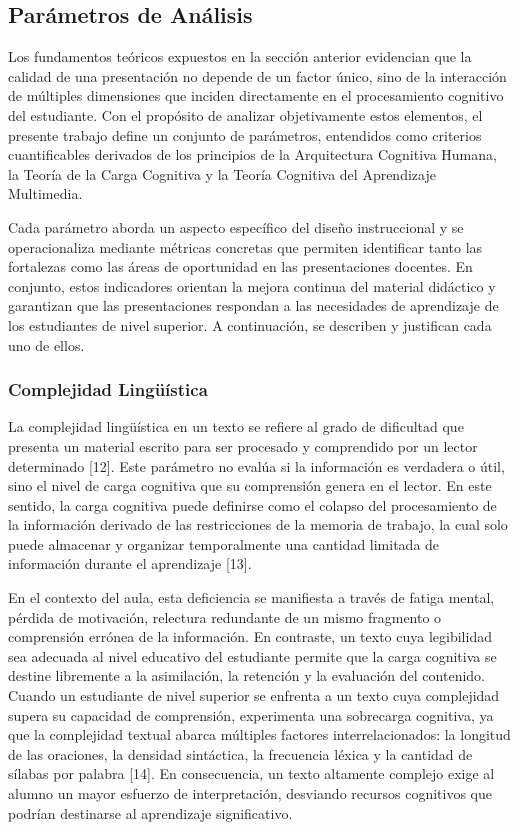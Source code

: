 \documentclass[11pt]{article}
\begin{document}
\subsection*{Parámetros de Análisis}
Los fundamentos teóricos expuestos en la sección anterior evidencian que la calidad de una presentación no depende de un factor único, sino de la interacción de múltiples dimensiones que inciden directamente en el procesamiento cognitivo del estudiante. Con el propósito de analizar objetivamente estos elementos, el presente trabajo define un conjunto de parámetros, entendidos como criterios cuantificables derivados de los principios de la Arquitectura Cognitiva Humana, la Teoría de la Carga Cognitiva y la Teoría Cognitiva del Aprendizaje Multimedia.

Cada parámetro aborda un aspecto específico del diseño instruccional y se operacionaliza mediante métricas concretas que permiten identificar tanto las fortalezas como las áreas de oportunidad en las presentaciones docentes. En conjunto, estos indicadores orientan la mejora continua del material didáctico y garantizan que las presentaciones respondan a las necesidades de aprendizaje de los estudiantes de nivel superior. A continuación, se describen y justifican cada uno de ellos.

\subsubsection*{Complejidad Lingüística}
La complejidad lingüística en un texto se refiere al grado de dificultad que presenta un material escrito para ser procesado y comprendido por un lector determinado [12]. Este parámetro no evalúa si la información es verdadera o útil, sino el nivel de carga cognitiva que su comprensión genera en el lector. En este sentido, la carga cognitiva puede definirse como el colapso del procesamiento de la información derivado de las restricciones de la memoria de trabajo, la cual solo puede almacenar y organizar temporalmente una cantidad limitada de información durante el aprendizaje [13].

En el contexto del aula, esta deficiencia se manifiesta a través de fatiga mental, pérdida de motivación, relectura redundante de un mismo fragmento o comprensión errónea de la información. En contraste, un texto cuya legibilidad sea adecuada al nivel educativo del estudiante permite que la carga cognitiva se destine libremente a la asimilación, la retención y la evaluación del contenido.
Cuando un estudiante de nivel superior se enfrenta a un texto cuya complejidad supera su capacidad de comprensión, experimenta una sobrecarga cognitiva, ya que la complejidad textual abarca múltiples factores interrelacionados: la longitud de las oraciones, la densidad sintáctica, la frecuencia léxica y la cantidad de sílabas por palabra [14]. En consecuencia, un texto altamente complejo exige al alumno un mayor esfuerzo de interpretación, desviando recursos cognitivos que podrían destinarse al aprendizaje significativo.
\end{document}
